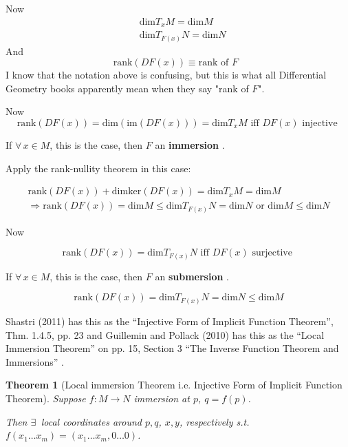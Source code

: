 \documentclass[10pt]{amsart}
\newtheorem{theorem}{Theorem}
\begin{document}
\begin{multicols*}{2}
Now 
\[
\begin{aligned}
& \text{dim}T_xM = \text{dim}M \\ 
& \text{dim}T_{F(x)}N = \text{dim}N 
\end{aligned}
\]
And 
\[
\text{rank}(DF(x)) \equiv \text{rank of $F$ }
\]
I know that the notation above is confusing, but this is what all Differential Geometry books apparently mean when they say "rank of $F$".  

Now  
\[
\text{rank}(DF(x)) = \text{dim}(\text{im}(DF(x)))  = \text{dim}T_xM \text{ iff } DF(x) \text{ injective }  
\]

If $\forall \, x \in M$, this is the case, then $F$ an \textbf{ immersion }.  

Apply the rank-nullity theorem in this case:  

\[
\begin{gathered}
	\text{rank}(DF(x)) + \text{dim}\text{ker}(DF(x)) = \text{dim}T_xM = \text{dim}M \\ 
	\Longrightarrow \text{rank}(DF(x)) = \text{dim}M \leq \text{dim}T_{F(x)}N = \text{dim}N \text{ or } \text{dim}M \leq \text{dim}N 
\end{gathered}
\]

Now 

\[
\text{rank}(DF(x)) = \text{dim}T_{F(x)}N \text{ iff } DF(x) \text{ surjective }  
\]

If $\forall \, x \in M$, this is the case, then $F$ an \textbf{ submersion }.  

\[
 \text{rank}(DF(x)) = \text{dim}T_{F(x)}N = \text{dim}N  \leq \text{dim}M  
\]

Shastri (2011) has this as the ``Injective Form of Implicit Function Theorem'', Thm. 1.4.5, pp. 23 and Guillemin and Pollack (2010) has this as the ``Local Immersion Theorem'' on pp. 15, Section 3 ``The Inverse Function Theorem and Immersions'' \cite{VGuilleminAPollack2010}.  

\begin{theorem}[Local immersion Theorem i.e. Injective Form of Implicit Function Theorem]\label{Thm:LocalImmersion}
  Suppose $f:M\to N$ immersion at $p$, $q=f(p)$.  

Then $\exists \, $ local coordinates around $p,q$, $x,y$, respectively s.t. $f(x_1\dots x_m) = (x_1 \dots x_m,0 \dots 0)$.  

\end{theorem}


\end{multicols*}
\end{document}
